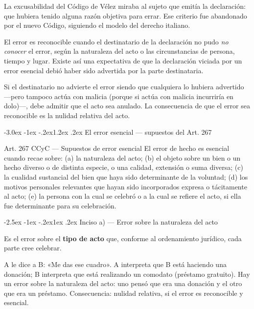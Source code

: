 \documentclass[12pt,oneside]{book}
\makeatletter
\renewcommand\section{\@startsection{section}{1}{\z@}%
  {-3.0ex \@plus -1ex \@minus -.2ex}{1.2ex \@plus .2ex}%
  {\normalfont\large\bfseries\color{acento}}}
\renewcommand\subsection{\@startsection{subsection}{2}{\z@}%
  {-2.5ex \@plus -1ex \@minus -.2ex}{1ex \@plus .2ex}%
  {\normalfont\normalsize\bfseries}}
\makeatother
\begin{document}
La excusabilidad del Código de Vélez miraba al sujeto que emitía la declaración: que hubiera tenido alguna razón objetiva para errar. Ese criterio fue abandonado por el nuevo Código, siguiendo el modelo del derecho italiano.

El error es reconocible cuando el destinatario de la declaración no pudo \textit{no conocer} el error, según la naturaleza del acto o las circunstancias de persona, tiempo y lugar. Existe así una expectativa de que la declaración viciada por un error esencial debió haber sido advertida por la parte destinataria.

Si el destinatario no advierte el error siendo que cualquiera lo hubiera advertido ---pero tampoco actúa con malicia (porque si actúa con malicia incurriría en dolo)---, debe admitir que el acto sea anulado. La consecuencia de que el error sea reconocible es la nulidad relativa del acto.

\section{El error esencial --- supuestos del Art. 267}

\begin{articulo}{Art. 267 CCyC --- Supuestos de error esencial}
El error de hecho es esencial cuando recae sobre: (a) la naturaleza del acto; (b) el objeto sobre un bien o un hecho diverso o de distinta especie, o una calidad, extensión o suma diversa; (c) la cualidad sustancial del bien que haya sido determinante de la voluntad; (d) los motivos personales relevantes que hayan sido incorporados expresa o tácitamente al acto; (e) la persona con la cual se celebró o a la cual se refiere el acto, si ella fue determinante para su celebración.
\end{articulo}

\subsection{Inciso a) --- Error sobre la naturaleza del acto}

Es el error sobre el \textbf{tipo de acto} que, conforme al ordenamiento jurídico, cada parte cree celebrar.

\begin{ejemplo}
A le dice a B: «Me das ese cuadro». A interpreta que B está haciendo una donación; B interpreta que está realizando un comodato (préstamo gratuito). Hay un error sobre la naturaleza del acto: uno pensó que era una donación y el otro que era un préstamo. Consecuencia: nulidad relativa, si el error es reconocible y esencial.
\end{ejemplo}
\end{document}
